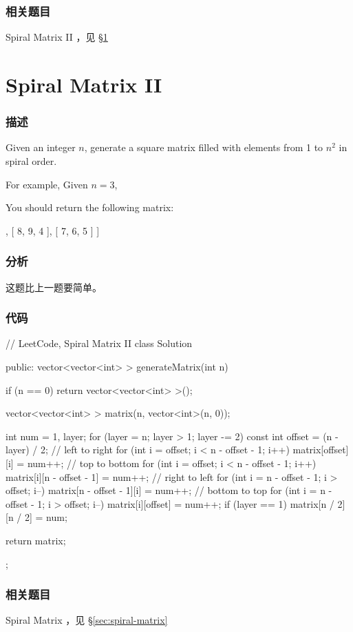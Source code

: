 \subsubsection{相关题目}
\begindot
\item Spiral Matrix II ，见 \S \ref{sec:spiral-matrix-ii}
\myenddot


\section{Spiral Matrix II} %
\label{sec:spiral-matrix-ii}


\subsubsection{描述}
Given an integer $n$, generate a square matrix filled with elements from 1 to $n^2$ in spiral order.

For example,
Given $n = 3$,

You should return the following matrix:
\begin{Code}
[
 [ 1, 2, 3 ],
 [ 8, 9, 4 ],
 [ 7, 6, 5 ]
]
\end{Code}


\subsubsection{分析}
这题比上一题要简单。


\subsubsection{代码}
\begin{Code}
// LeetCode, Spiral Matrix II
class Solution {
public:
    vector<vector<int> > generateMatrix(int n) {
        if (n == 0) return vector<vector<int> >();

        vector<vector<int> > matrix(n, vector<int>(n, 0));

        int num = 1, layer;
        for (layer = n; layer > 1; layer -= 2) {
            const int offset = (n - layer) / 2;
            // left to right
            for (int i = offset; i < n - offset - 1; i++)
                matrix[offset][i] = num++;
            // top to bottom
            for (int i = offset; i < n - offset - 1; i++)
                matrix[i][n - offset - 1] = num++;
            // right to left
            for (int i = n - offset - 1; i > offset; i--)
                matrix[n - offset - 1][i] = num++;
            // bottom to top
            for (int i = n - offset - 1; i > offset; i--)
                matrix[i][offset] = num++;
        }
        if (layer == 1) matrix[n / 2][n / 2] = num;

        return matrix;
    }
};
\end{Code}


\subsubsection{相关题目}
\begindot
\item Spiral Matrix ，见 \S \ref{sec:spiral-matrix}
\myenddot
